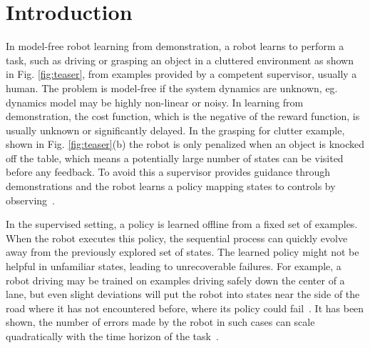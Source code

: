 \documentclass[10pt, conference]{ieeeconf}      %
\begin{document}

\section{Introduction} 


In model-free robot learning from demonstration, a robot learns to perform a task, such as driving or grasping an object in a cluttered environment as shown in Fig. \ref{fig:teaser}, from examples provided by a competent supervisor, usually a human. The problem is model-free if  the system dynamics are unknown, eg. dynamics model may be highly non-linear or noisy. In learning from demonstration, the cost function, which is the negative of the reward function, is usually unknown or significantly delayed. In the grasping for clutter example, shown in Fig. \ref{fig:teaser}(b) the robot is only penalized when an object is knocked off the table, which means a potentially large number of states can be visited before any feedback. To avoid this a supervisor provides guidance through demonstrations and the robot learns a policy mapping states to controls by observing~\cite{argall2009survey}.  

In the supervised setting, a policy is learned offline from a fixed set of examples. When the robot executes this policy, the sequential process can quickly evolve away from the previously explored set of states.  The learned policy might not be helpful in unfamiliar states, leading to unrecoverable failures.  For example, a robot driving may be trained on examples driving safely down the center of a lane, but even slight deviations will put the robot into states near the side of the road where it has not encountered before, where its policy could  fail~\cite{pomerleau1989alvinn}. It has been shown, the number of errors made by the robot in such cases  can scale quadratically with the time horizon of the task~\cite{ross2010efficient}.
\end{document}
